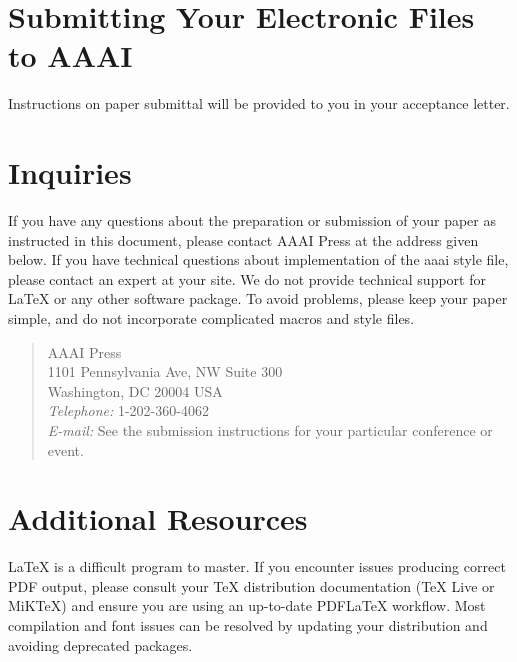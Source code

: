 \section{Submitting Your Electronic Files to AAAI}
Instructions on paper submittal will be provided to you in your acceptance letter.

\section{Inquiries}
If you have any questions about the preparation or submission of your paper as instructed in this document, please contact AAAI Press at the address given below. If you have technical questions about implementation of the aaai style file, please contact an expert at your site. We do not provide technical support for \LaTeX{} or any other software package. To avoid problems, please keep your paper simple, and do not incorporate complicated macros and style files.

\begin{quote}
\noindent AAAI Press\\
1101 Pennsylvania Ave, NW Suite 300\\
Washington, DC 20004 USA\\
\textit{Telephone:} 1-202-360-4062\\
\textit{E-mail:} See the submission instructions for your particular conference or event.
\end{quote}

\section{Additional Resources}
\LaTeX{} is a difficult program to master. If you encounter issues producing correct PDF output, please consult your TeX distribution documentation (TeX Live or MiKTeX) and ensure you are using an up-to-date PDF\LaTeX{} workflow. Most compilation and font issues can be resolved by updating your distribution and avoiding deprecated packages.
